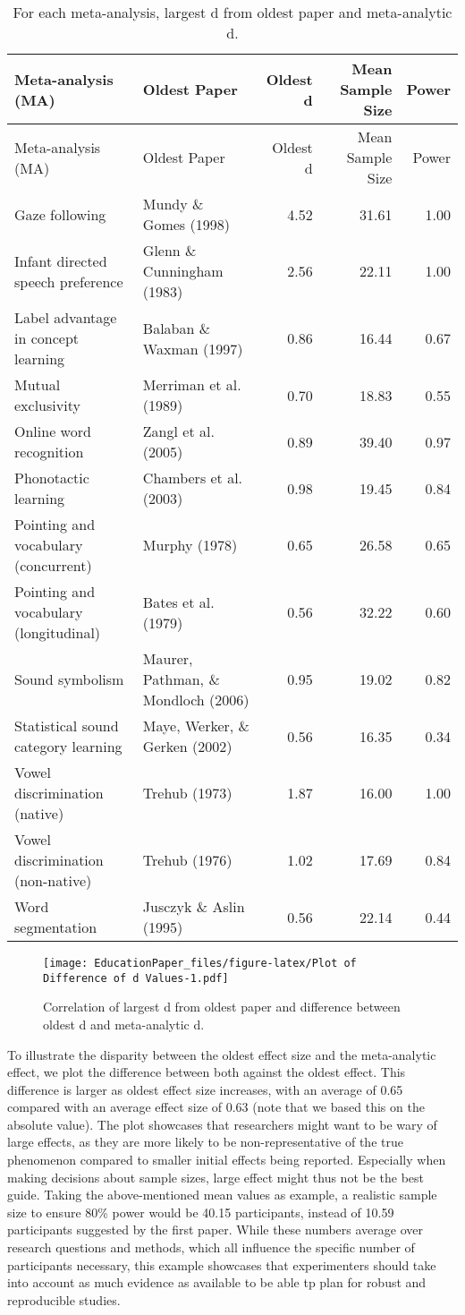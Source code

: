 \documentclass[english,floatsintext,man]{apa6}
\begin{document}
\begin{longtable}[c]{@{}llrrr@{}}
\caption{For each meta-analysis, largest d from oldest paper and
meta-analytic d.}\tabularnewline
\toprule
Meta-analysis (MA) & Oldest Paper & Oldest d & Mean Sample Size &
Power\tabularnewline
\midrule
\endfirsthead
\toprule
Meta-analysis (MA) & Oldest Paper & Oldest d & Mean Sample Size &
Power\tabularnewline
\midrule
\endhead
Gaze following & Mundy \& Gomes (1998) & 4.52 & 31.61 &
1.00\tabularnewline
Infant directed speech preference & Glenn \& Cunningham (1983) & 2.56 &
22.11 & 1.00\tabularnewline
Label advantage in concept learning & Balaban \& Waxman (1997) & 0.86 &
16.44 & 0.67\tabularnewline
Mutual exclusivity & Merriman et al. (1989) & 0.70 & 18.83 &
0.55\tabularnewline
Online word recognition & Zangl et al. (2005) & 0.89 & 39.40 &
0.97\tabularnewline
Phonotactic learning & Chambers et al. (2003) & 0.98 & 19.45 &
0.84\tabularnewline
Pointing and vocabulary (concurrent) & Murphy (1978) & 0.65 & 26.58 &
0.65\tabularnewline
Pointing and vocabulary (longitudinal) & Bates et al. (1979) & 0.56 &
32.22 & 0.60\tabularnewline
Sound symbolism & Maurer, Pathman, \& Mondloch (2006) & 0.95 & 19.02 &
0.82\tabularnewline
Statistical sound category learning & Maye, Werker, \& Gerken (2002) &
0.56 & 16.35 & 0.34\tabularnewline
Vowel discrimination (native) & Trehub (1973) & 1.87 & 16.00 &
1.00\tabularnewline
Vowel discrimination (non-native) & Trehub (1976) & 1.02 & 17.69 &
0.84\tabularnewline
Word segmentation & Jusczyk \& Aslin (1995) & 0.56 & 22.14 &
0.44\tabularnewline
\bottomrule
\end{longtable}

\begin{figure}[htbp]
\centering
\texttt{[image: EducationPaper\_files/figure-latex/Plot of Difference of d Values-1.pdf]}
\caption{Correlation of largest d from oldest paper and difference
between oldest d and meta-analytic d.}
\end{figure}

To illustrate the disparity between the oldest effect size and the
meta-analytic effect, we plot the difference between both against the
oldest effect. This difference is larger as oldest effect size
increases, with an average of 0.65 compared with an average effect size
of 0.63 (note that we based this on the absolute value). The plot
showcases that researchers might want to be wary of large effects, as
they are more likely to be non-representative of the true phenomenon
compared to smaller initial effects being reported. Especially when
making decisions about sample sizes, large effect might thus not be the
best guide. Taking the above-mentioned mean values as example, a
realistic sample size to ensure 80\% power would be 40.15 participants,
instead of 10.59 participants suggested by the first paper. While these
numbers average over research questions and methods, which all influence
the specific number of participants necessary, this example showcases
that experimenters should take into account as much evidence as
available to be able tp plan for robust and reproducible studies.
\end{document}
